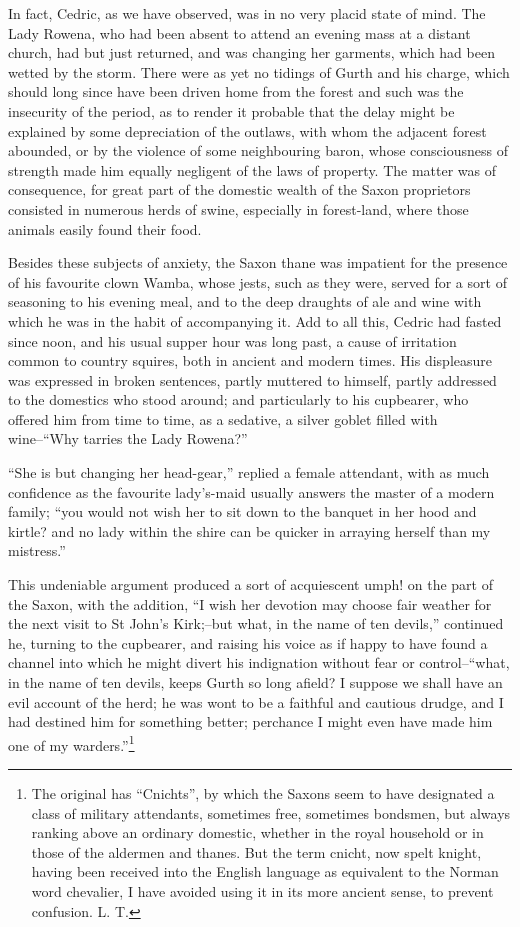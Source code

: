 In fact, Cedric, as we have observed, was in no very placid state of
mind. The Lady Rowena, who had been absent to attend an evening mass at
a distant church, had but just returned, and was changing her garments,
which had been wetted by the storm. There were as yet no tidings of
Gurth and his charge, which should long since have been driven home from
the forest and such was the insecurity of the period, as to render it
probable that the delay might be explained by some depreciation of the
outlaws, with whom the adjacent forest abounded, or by the violence of
some neighbouring baron, whose consciousness of strength made him
equally negligent of the laws of property. The matter was of
consequence, for great part of the domestic wealth of the Saxon
proprietors consisted in numerous herds of swine, especially in
forest-land, where those animals easily found their food.

Besides these subjects of anxiety, the Saxon thane was impatient for the
presence of his favourite clown Wamba, whose jests, such as they were,
served for a sort of seasoning to his evening meal, and to the deep
draughts of ale and wine with which he was in the habit of accompanying
it. Add to all this, Cedric had fasted since noon, and his usual supper
hour was long past, a cause of irritation common to country squires,
both in ancient and modern times. His displeasure was expressed in
broken sentences, partly muttered to himself, partly addressed to the
domestics who stood around; and particularly to his cupbearer, who
offered him from time to time, as a sedative, a silver goblet filled
with wine--``Why tarries the Lady Rowena?''

``She is but changing her head-gear,'' replied a female attendant, with
as much confidence as the favourite lady's-maid usually answers the
master of a modern family; ``you would not wish her to sit down to the
banquet in her hood and kirtle? and no lady within the shire can be
quicker in arraying herself than my mistress.''

This undeniable argument produced a sort of acquiescent umph! on the
part of the Saxon, with the addition, ``I wish her devotion may choose
fair weather for the next visit to St John's Kirk;--but what, in the
name of ten devils,'' continued he, turning to the cupbearer, and
raising his voice as if happy to have found a channel into which he
might divert his indignation without fear or control--``what, in the
name of ten devils, keeps Gurth so long afield? I suppose we shall have
an evil account of the herd; he was wont to be a faithful and cautious
drudge, and I had destined him for something better; perchance I might
even have made him one of my warders.''\footnote{The original
has ``Cnichts'', by which the Saxons seem
to have designated a class of military attendants, sometimes free,
sometimes bondsmen, but always ranking above an ordinary domestic,
whether in the royal household or in those of the aldermen and thanes.
But the term cnicht, now spelt knight, having been received into the
English language as equivalent to the Norman word chevalier, I have
avoided using it in its more ancient sense, to prevent confusion. L.
T.}

